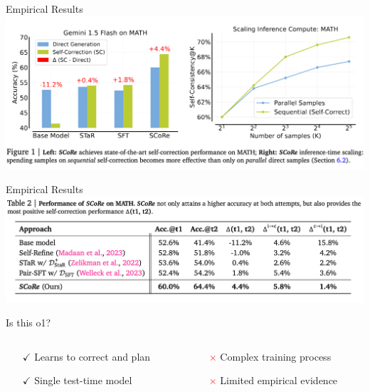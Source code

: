 \documentclass[14pt,aspectratio=169]{beamer}
\begin{document}
\begin{frame}{Empirical Results}
	\includegraphics[width=\textwidth]{images/score_figure_1.png}
\end{frame}
\begin{frame}{Empirical Results}
	\includegraphics[width=\textwidth]{images/score_table_2.png}
\end{frame}

\begin{frame}{Is this o1?}
	\begin{columns}
		\begin{column}{0.5\linewidth}
			\begin{itemize}
				\item[$\boldsymbol{\checkmark}$] Learns to correct and plan
				\item[$\boldsymbol{\checkmark}$] Single test-time model
			\end{itemize}
		\end{column}
		\begin{column}{0.5\linewidth}
			\begin{itemize}
				\item[\textcolor{red}{$\boldsymbol{\times}$}] Complex training process
				\item[\textcolor{red}{$\boldsymbol{\times}$}] Limited empirical evidence
			\end{itemize}
		\end{column}
	\end{columns}
\end{frame}
\end{document}
